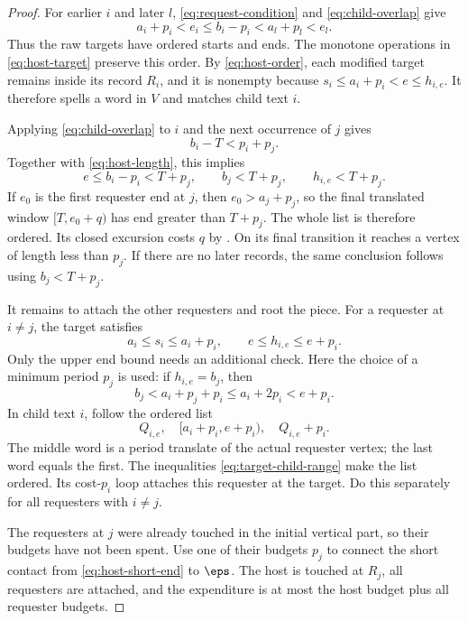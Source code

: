 \begin{proof}
For earlier $i$ and later $l$, \eqref{eq:request-condition} and \eqref{eq:child-overlap} give
\[
a_i+p_i<e_i\le b_i-p_i<a_l+p_l<e_l.
\]
Thus the raw targets have ordered starts and ends. The monotone operations in \eqref{eq:host-target} preserve this order. By \eqref{eq:host-order}, each modified target remains inside its record $R_i$, and it is nonempty because $s_i\le a_i+p_i<e\le h_{i,e}$. It therefore spells a word in $V$ and matches child text $i$.

Applying \eqref{eq:child-overlap} to $i$ and the next occurrence of $j$ gives
\[
b_i-T<p_i+p_j.
\]
Together with \eqref{eq:host-length}, this implies
\begin{equation}\label{eq:host-short-end}
e\le b_i-p_i<T+p_j,\qquad b_j<T+p_j,
\qquad h_{i,e}<T+p_j.
\end{equation}
If $e_0$ is the first requester end at $j$, then $e_0>a_j+p_j$, so the final translated window $[T,e_0+q)$ has end greater than $T+p_j$. The whole list is therefore ordered. Its closed excursion costs $q$ by . On its final transition it reaches a vertex of length less than $p_j$. If there are no later records, the same conclusion follows using $b_j<T+p_j$.

It remains to attach the other requesters and root the piece. For a requester at $i\ne j$, the target satisfies
\begin{equation}\label{eq:target-child-range}
a_i\le s_i\le a_i+p_i,
\qquad e\le h_{i,e}\le e+p_i.
\end{equation}
Only the upper end bound needs an additional check. Here the choice of a minimum period $p_j$ is used: if $h_{i,e}=b_j$, then
\[
b_j<a_i+p_j+p_i\le a_i+2p_i<e+p_i.
\]
In child text $i$, follow the ordered list
\[
Q_{i,e},\quad[a_i+p_i,e+p_i),\quad Q_{i,e}+p_i.
\]
The middle word is a period translate of the actual requester vertex; the last word equals the first. The inequalities \eqref{eq:target-child-range} make the list ordered. Its cost-$p_i$ loop attaches this requester at the target. Do this separately for all requesters with $i\ne j$.

The requesters at $j$ were already touched in the initial vertical part, so their budgets have not been spent. Use one of their budgets $p_j$ to connect the short contact from \eqref{eq:host-short-end} to $\eps$. The host is touched at $R_j$, all requesters are attached, and the expenditure is at most the host budget plus all requester budgets.
\end{proof}

